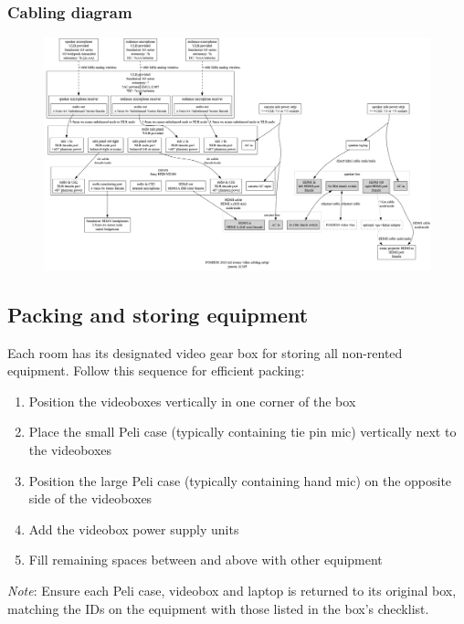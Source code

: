 \documentclass{article}
\begin{document}
\subsubsection{Cabling diagram}
\begin{figure}[H]
  \begin{sideways}
  \centering
  \includegraphics[width = 200mm]{../../graph/cabling_xxl_rooms.png}
  \end{sideways}
\end{figure}

\subsection{Packing and storing equipment}
Each room has its designated video gear box for storing all non-rented equipment. Follow this sequence for efficient packing:

\begin{enumerate}
    \item Position the videoboxes vertically in one corner of the box
    \item Place the small Peli case (typically containing tie pin mic) vertically next to the videoboxes
    \item Position the large Peli case (typically containing hand mic) on the opposite side of the videoboxes
    \item Add the videobox power supply units
    \item Fill remaining spaces between and above with other equipment
\end{enumerate}

\emph{Note}: Ensure each Peli case, videobox and laptop is returned to its original box, matching the IDs on the equipment with those listed in the box's checklist.
\end{document}

